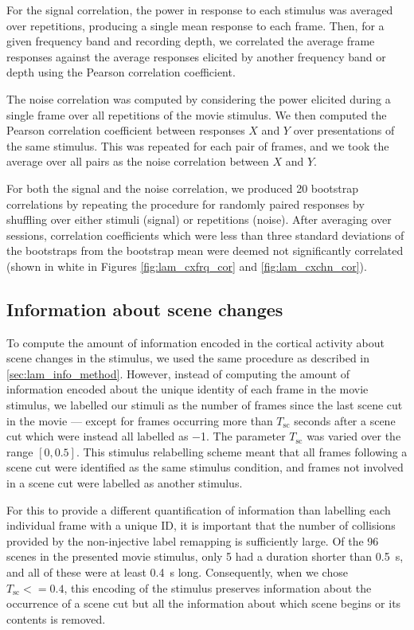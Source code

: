 For the signal correlation, the power in response to each stimulus was averaged over repetitions, producing a single mean response to each frame.
Then, for a given frequency band and recording depth, we correlated the average frame responses against the average responses elicited by another frequency band or depth using the Pearson correlation coefficient.

The noise correlation was computed by considering the power elicited during a single frame over all repetitions of the movie stimulus.
We then computed the Pearson correlation coefficient between responses $X$ and $Y$ over presentations of the same stimulus.
This was repeated for each pair of frames, and we took the average over all pairs as the noise correlation between $X$ and $Y$.

For both the signal and the noise correlation, we produced \num{20} bootstrap correlations by repeating the procedure for randomly paired responses by shuffling over either stimuli (signal) or repetitions (noise).
After averaging over sessions, correlation coefficients which were less than three standard deviations of the bootstraps from the bootstrap mean were deemed not significantly correlated (shown in white in Figures \ref{fig:lam_cxfrq_cor} and \ref{fig:lam_cxchn_cor}).


\subsection{Information about scene changes}
\label{sec:lam_scnchg_method}

To compute the amount of information encoded in the cortical activity about scene changes in the stimulus, we used the same procedure as described in \autoref{sec:lam_info_method}.
However, instead of computing the amount of information encoded about the unique identity of each frame in the movie stimulus, we labelled our stimuli as the number of frames since the last scene cut in the movie --- except for frames occurring more than $T_\text{sc}$ seconds after a scene cut which were instead all labelled as \num{-1}.
The parameter $T_\text{sc}$ was varied over the range $[0, 0.5]$.
This stimulus relabelling scheme meant that all frames following a scene cut were identified as the same stimulus condition, and frames not involved in a scene cut were labelled as another stimulus.

For this to provide a different quantification of information than labelling each individual frame with a unique ID, it is important that the number of collisions provided by the non-injective label remapping is sufficiently large.
Of the \num{96} scenes in the presented movie stimulus, only \num{5} had a duration shorter than \SI{0.5}{\second}, and all of these were at least \SI{0.4}{\second} long.
Consequently, when we chose $T_\text{sc} <= 0.4$, this encoding of the stimulus preserves information about the occurrence of a scene cut but all the information about which scene begins or its contents is removed.

